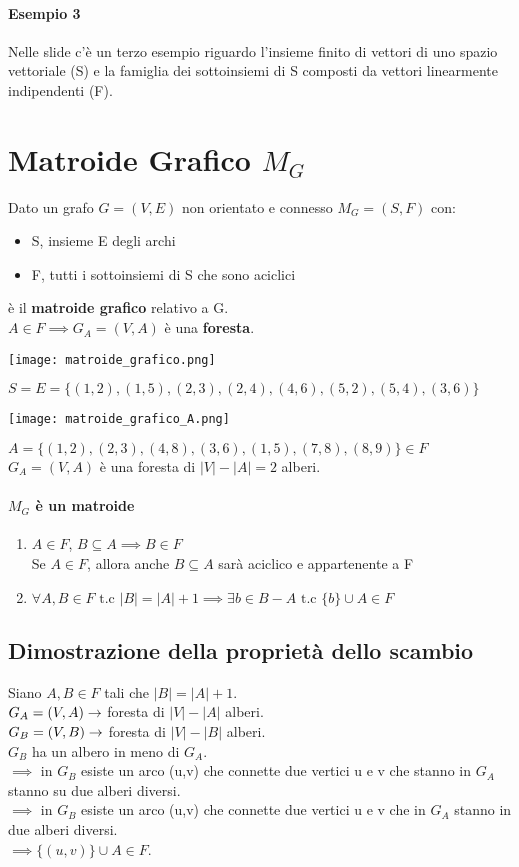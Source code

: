 \paragraph*{Esempio 3} Nelle slide c'è un terzo esempio riguardo l'insieme finito di vettori
di uno spazio vettoriale (S) e la famiglia dei sottoinsiemi di S composti da vettori 
linearmente indipendenti (F).
\section{Matroide Grafico $M_G$}
Dato un grafo $G=(V,E)$ non orientato e connesso $M_G = (S,F)$ con:
\begin{itemize}
    \item S, insieme E degli archi
    \item F, tutti i sottoinsiemi di S che sono aciclici
\end{itemize}
è il \textbf{matroide grafico} relativo a G.\\
$A \in F \implies G_A = (V,A)$ è una \textbf{foresta}.
\begin{center}
    \texttt{[image: matroide\_grafico.png]}
\end{center}
$S = E = \{(1,2), (1,5), (2,3), (2,4), (4,6), (5,2), (5,4), (3,6)\}$\\
\begin{center}
    \texttt{[image: matroide\_grafico\_A.png]}
\end{center}
$A = \{(1,2), (2,3), (4,8), (3,6), (1,5), (7,8), (8,9)\} \in F$\\
$G_A=(V,A)$ è una foresta di $|V|-|A| = 2$ alberi.
\paragraph*{$M_G$ è un matroide}
\begin{enumerate}
    \item $A \in F$, $B \subseteq A \implies B \in F$\\
    Se $A \in F$, allora anche $B \subseteq A$ sarà aciclico e appartenente a F
    \item $\forall A,B \in F \text{ t.c } |B| = |A| + 1 \implies \exists b \in B-A
    \text{ t.c } \{b\} \cup A \in F$
\end{enumerate}
\subsection{Dimostrazione della proprietà dello scambio}
Siano $A,B \in F$ tali che $|B|=|A| + 1$.\\
$G_A = (V,A) \rightarrow$ foresta di $|V| - |A|$ alberi.\\
$G_B = (V, B) \rightarrow$ foresta di $|V|-|B|$ alberi.\\
$G_B$ ha un albero in meno di $G_A$.\\
$\implies$ in $G_B$ esiste un arco (u,v) che connette due vertici u e v che stanno
in $G_A$ stanno su due alberi diversi.\\
$\implies$ in $G_B$ esiste un arco (u,v) che connette due vertici u e v che in 
$G_A$ stanno in due alberi diversi.\\
$\implies \{(u,v)\} \cup A \in F$.

